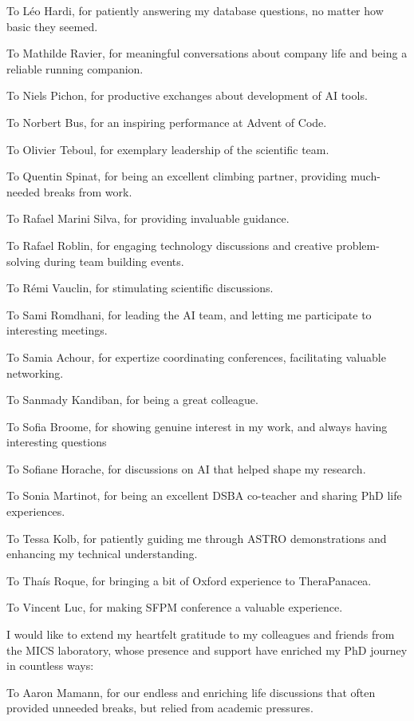 To Léo Hardi, for patiently answering my database questions, no matter how basic they seemed.

To Mathilde Ravier, for meaningful conversations about company life and being a reliable running companion.

To Niels Pichon, for productive exchanges about development of AI tools.

To Norbert Bus, for an inspiring performance at Advent of Code.

To Olivier Teboul, for exemplary leadership of the scientific team.

To Quentin Spinat, for being an excellent climbing partner, providing much-needed breaks from work.

To Rafael Marini Silva, for providing invaluable guidance.

To Rafael Roblin, for engaging technology discussions and creative problem-solving during team building events.

To Rémi Vauclin, for stimulating scientific discussions.

To Sami Romdhani, for leading the AI team, and letting me participate to interesting meetings.

To Samia Achour, for expertize coordinating conferences, facilitating valuable networking.

To Sanmady Kandiban, for being a great colleague.

To Sofia Broome, for showing genuine interest in my work, and always having interesting questions

To Sofiane Horache, for discussions on AI that helped shape my research.

To Sonia Martinot, for being an excellent DSBA co-teacher and sharing PhD life experiences.

To Tessa Kolb, for patiently guiding me through ASTRO demonstrations and enhancing my technical understanding.

To Thaís Roque, for bringing a bit of Oxford experience to TheraPanacea.

To Vincent Luc, for making SFPM conference a valuable experience.



I would like to extend my heartfelt gratitude to my colleagues and friends from the MICS laboratory, whose presence and support have enriched my PhD journey in countless ways:

To Aaron Mamann, for our endless and enriching life discussions that often provided unneeded breaks, but relied from academic pressures.

